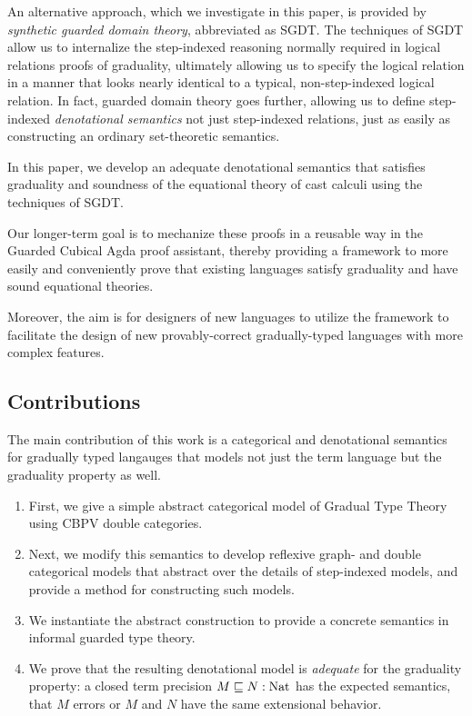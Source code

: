 An alternative approach, which we investigate in this paper, is provided by
\emph{synthetic guarded domain
theory}\cite{birkedal-mogelberg-schwinghammer-stovring2011}, abbreviated as
SGDT. The techniques of SGDT allow us to internalize the step-indexed reasoning
normally required in logical relations proofs of graduality, ultimately allowing
us to specify the logical relation in a manner that looks nearly identical to a
typical, non-step-indexed logical relation. In fact, guarded domain theory goes
further, allowing us to define step-indexed \emph{denotational semantics} not
just step-indexed relations, just as easily as constructing an ordinary
set-theoretic semantics.

In this paper, we develop an adequate denotational semantics that satisfies
graduality and soundness of the equational theory of cast calculi using the
techniques of SGDT.  

Our longer-term goal is to mechanize these proofs in a reusable way in the
Guarded Cubical Agda \cite{veltri-vezzosi2020} proof assistant, thereby
providing a framework to more easily and conveniently prove that existing
languages satisfy graduality and have sound equational theories.

Moreover, the aim is for designers of new languages to utilize the framework to
facilitate the design of new provably-correct gradually-typed languages with
more complex features.

\subsection{Contributions}

The main contribution of this work is a categorical and denotational semantics
for gradually typed langauges that models not just the term language but the
graduality property as well.
\begin{enumerate}
\item First, we give a simple abstract categorical model of Gradual Type Theory
using CBPV double categories.
\item Next, we modify this semantics to develop reflexive graph- and double
  categorical models that abstract over the details of step-indexed models, and
  provide a method for constructing such models.
\item We instantiate the abstract construction to provide a concrete semantics
  in informal guarded type theory.
\item We prove that the resulting denotational model is \emph{adequate} for the
  graduality property: a closed term precision $M \sqsubseteq N : \text{Nat}$ has the
  expected semantics, that $M$ errors or $M$ and $N$ have the same extensional
  behavior.
\end{enumerate}

